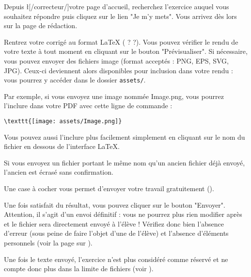 ﻿Depuis \l[/correcteur/]{votre page d'accueil}, recherchez l'exercice auquel vous souhaitez répondre puis cliquez sur le lien "Je m'y mets". Vous arrivez dès lors sur la page de rédaction.

Rentrez votre corrigé au format LaTeX ( ?  ?).
Vous pouvez vérifier le rendu de votre texte à tout moment en cliquant sur le bouton "Prévisualiser".
Si nécessaire, vous pouvez envoyer des fichiers image (format acceptés : PNG, EPS, SVG, JPG). Ceux-ci deviennent alors disponibles pour inclusion dans votre rendu : vous pourrez y accéder dans le dossier \texttt{assets/}.

Par exemple, si vous envoyez une image nommée Image.png, vous pourrez l'inclure dans votre PDF avec cette ligne de commande :
\begin{verbatim}
\texttt{[image: assets/Image.png]}
\end{verbatim}
Vous pouvez aussi l'inclure plus facilement simplement en cliquant sur le nom du fichier en dessous de l'interface LaTeX.

Si vous envoyez un fichier portant le même nom qu'un ancien fichier déjà envoyé, l'ancien est écrasé sans confirmation.

Une case à cocher vous permet d'envoyer votre travail gratuitement ().

Une fois satisfait du résultat, vous pouvez cliquer sur le bouton "Envoyer". Attention, il s'agit d'un envoi définitif : vous ne pourrez plus rien modifier après et le fichier sera directement envoyé à l'élève ! Vérifiez donc bien l'absence d'erreur (sous peine de faire l'objet d'une  de l'élève) et l'absence d'éléments personnels (voir la page sur ).

Une fois le texte envoyé, l'exercice n'est plus considéré comme réservé et ne compte donc plus dans la limite de fichiers (voir ).